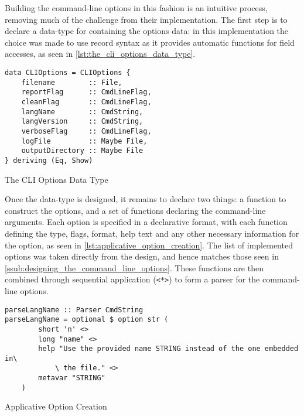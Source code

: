 Building the command-line options in this fashion is an intuitive process, removing much of the challenge from their implementation. 
The first step is to declare a data-type for containing the options data: in this implementation the choice was made to use record syntax as it provides automatic functions for field accesses, as seen in \autoref{lst:the_cli_options_data_type}.

\begin{listing}[!htb]
\begin{verbatim}
data CLIOptions = CLIOptions {
    filename        :: File,
    reportFlag      :: CmdLineFlag,
    cleanFlag       :: CmdLineFlag,
    langName        :: CmdString,
    langVersion     :: CmdString,
    verboseFlag     :: CmdLineFlag,
    logFile         :: Maybe File,
    outputDirectory :: Maybe File
} deriving (Eq, Show)
\end{verbatim}
\caption{The CLI Options Data Type}
\label{lst:the_cli_options_data_type}
\end{listing}

Once the data-type is designed, it remains to declare two things: a function to construct the options, and a set of functions declaring the command-line arguments.
Each option is specified in a declarative format, with each function defining the type, flags, format, help text and any other necessary information for the option, as seen in \autoref{lst:applicative_option_creation}.
The list of implemented options was taken directly from the design, and hence matches those seen in \autoref{ssub:designing_the_command_line_options}.
These functions are then combined through sequential application (\texttt{<*>}) to form a parser for the command-line options.

\begin{listing}[!htb]
\begin{verbatim}
parseLangName :: Parser CmdString
parseLangName = optional $ option str (
        short 'n' <>
        long "name" <>
        help "Use the provided name STRING instead of the one embedded in\
            \ the file." <>
        metavar "STRING"
    )
\end{verbatim}
\caption{Applicative Option Creation}
\label{lst:applicative_option_creation}
\end{listing}



